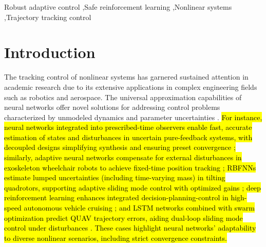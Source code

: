 \documentclass[preprint,12pt]{elsarticle}
\begin{document}
\begin{frontmatter}


\begin{keyword}
Robust adaptive control \sep Safe reinforcement learning \sep Nonlinear systems \sep Trajectory tracking control
\end{keyword}

\end{frontmatter}


\section{Introduction}

The tracking control of nonlinear systems has garnered sustained attention in academic research due to its extensive applications in complex engineering fields such as robotics and aerospace. The universal approximation capabilities of neural networks offer novel solutions for addressing control problems characterized by unmodeled dynamics and parameter uncertainties \cite{486648,6797088,4639441}. \hl{For instance, neural networks integrated into prescribed-time observers enable fast, accurate estimation of states and disturbances in uncertain pure-feedback systems, with decoupled designs simplifying synthesis and ensuring preset convergence \cite {LV2025125813}; similarly, adaptive neural networks compensate for external disturbances in exoskeleton wheelchair robots to achieve fixed-time position tracking \cite {math10203853}; RBFNNs estimate lumped uncertainties (including time-varying mass) in tilting quadrotors, supporting adaptive sliding mode control with optimized gains \cite {https://doi.org/10.1002/rnc.7932}; deep reinforcement learning enhances integrated decision-planning-control in high-speed autonomous vehicle cruising \cite {10.1109/TITS.2024.3488519}; and LSTM networks combined with swarm optimization predict QUAV trajectory errors, aiding dual-loop sliding mode control under disturbances \cite {SRarticle}. These cases highlight neural networks' adaptability to diverse nonlinear scenarios, including strict convergence constraints.}
\end{document}
